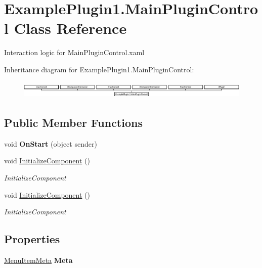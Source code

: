 \hypertarget{class_example_plugin1_1_1_main_plugin_control}{}\section{Example\+Plugin1.\+Main\+Plugin\+Control Class Reference}
\label{class_example_plugin1_1_1_main_plugin_control}


Interaction logic for Main\+Plugin\+Control.\+xaml  


Inheritance diagram for Example\+Plugin1.\+Main\+Plugin\+Control\+:\begin{figure}[H]
\begin{center}
\leavevmode
\includegraphics[height=0.860215cm]{d0/dbb/class_example_plugin1_1_1_main_plugin_control}
\end{center}
\end{figure}
\subsection*{Public Member Functions}
\begin{DoxyCompactItemize}
\item 
\mbox{\label{class_example_plugin1_1_1_main_plugin_control_ae2aae6d997eff2433e8eaebafbe800ed}} 
void {\bfseries On\+Start} (object sender)
\item 
void \mbox{\hyperlink{class_example_plugin1_1_1_main_plugin_control_a23d923a8762cd34a0c6403ee994427d4}{Initialize\+Component}} ()
\begin{DoxyCompactList}\small\item\em Initialize\+Component \end{DoxyCompactList}\item 
void \mbox{\hyperlink{class_example_plugin1_1_1_main_plugin_control_a23d923a8762cd34a0c6403ee994427d4}{Initialize\+Component}} ()
\begin{DoxyCompactList}\small\item\em Initialize\+Component \end{DoxyCompactList}\end{DoxyCompactItemize}
\subsection*{Properties}
\begin{DoxyCompactItemize}
\item 
\mbox{\hyperlink{class_wpf_handler_1_1_plugins_1_1_menu_item_meta}{Menu\+Item\+Meta}} {\bfseries Meta}
\end{DoxyCompactItemize}

